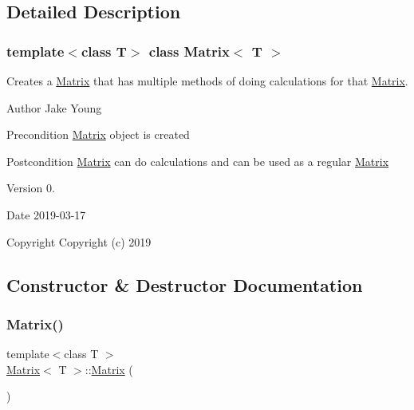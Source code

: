 \subsection{Detailed Description}
\subsubsection*{template$<$class T$>$\newline
class Matrix$<$ T $>$}

Creates a \mbox{\hyperlink{class_matrix}{Matrix}} that has multiple methods of doing calculations for that \mbox{\hyperlink{class_matrix}{Matrix}}. 

\begin{DoxyAuthor}{Author}
Jake Young 
\end{DoxyAuthor}
\begin{DoxyPrecond}{Precondition}
\mbox{\hyperlink{class_matrix}{Matrix}} object is created 
\end{DoxyPrecond}
\begin{DoxyPostcond}{Postcondition}
\mbox{\hyperlink{class_matrix}{Matrix}} can do calculations and can be used as a regular \mbox{\hyperlink{class_matrix}{Matrix}} 
\end{DoxyPostcond}
\begin{DoxyVersion}{Version}
0. 
\end{DoxyVersion}
\begin{DoxyDate}{Date}
2019-\/03-\/17
\end{DoxyDate}
\begin{DoxyCopyright}{Copyright}
Copyright (c) 2019 
\end{DoxyCopyright}


\subsection{Constructor \& Destructor Documentation}
\mbox{\label{class_matrix_a9d567e3a121b1be0c3f9c461cab524fe}} 
\subsubsection{\texorpdfstring{Matrix()}{Matrix()}\hspace{0.1cm}{\footnotesize\ttfamily [1/4]}}
{\footnotesize\ttfamily template$<$class T $>$ \\
\mbox{\hyperlink{class_matrix}{Matrix}}$<$ T $>$\+::\mbox{\hyperlink{class_matrix}{Matrix}} (\begin{DoxyParamCaption}{ }\end{DoxyParamCaption})}



